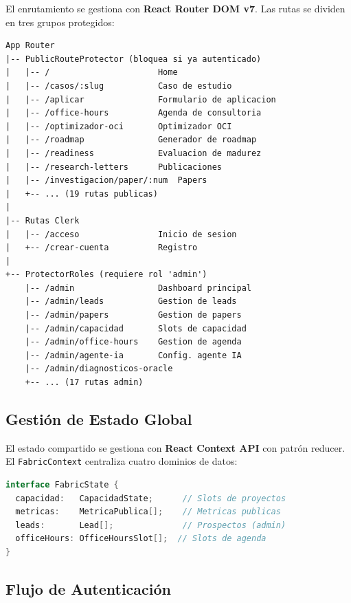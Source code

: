 \documentclass[12pt, a4paper, twoside]{report}
\begin{document}
El enrutamiento se gestiona con \textbf{React Router DOM v7}. Las rutas se dividen en tres
grupos protegidos:

\begin{tcolorbox}[codebox]
\begin{verbatim}
App Router
|-- PublicRouteProtector (bloquea si ya autenticado)
|   |-- /                      Home
|   |-- /casos/:slug           Caso de estudio
|   |-- /aplicar               Formulario de aplicacion
|   |-- /office-hours          Agenda de consultoria
|   |-- /optimizador-oci       Optimizador OCI
|   |-- /roadmap               Generador de roadmap
|   |-- /readiness             Evaluacion de madurez
|   |-- /research-letters      Publicaciones
|   |-- /investigacion/paper/:num  Papers
|   +-- ... (19 rutas publicas)
|
|-- Rutas Clerk
|   |-- /acceso                Inicio de sesion
|   +-- /crear-cuenta          Registro
|
+-- ProtectorRoles (requiere rol 'admin')
    |-- /admin                 Dashboard principal
    |-- /admin/leads           Gestion de leads
    |-- /admin/papers          Gestion de papers
    |-- /admin/capacidad       Slots de capacidad
    |-- /admin/office-hours    Gestion de agenda
    |-- /admin/agente-ia       Config. agente IA
    |-- /admin/diagnosticos-oracle
    +-- ... (17 rutas admin)
\end{verbatim}
\end{tcolorbox}

\subsection{Gestión de Estado Global}

El estado compartido se gestiona con \textbf{React Context API} con patrón reducer.
El \texttt{FabricContext} centraliza cuatro dominios de datos:

\begin{tcolorbox}[codebox]
\begin{lstlisting}[language=Java, numbers=none]
interface FabricState {
  capacidad:   CapacidadState;      // Slots de proyectos
  metricas:    MetricaPublica[];    // Metricas publicas
  leads:       Lead[];              // Prospectos (admin)
  officeHours: OfficeHoursSlot[];  // Slots de agenda
}
\end{lstlisting}
\end{tcolorbox}

\subsection{Flujo de Autenticación}
\end{document}
